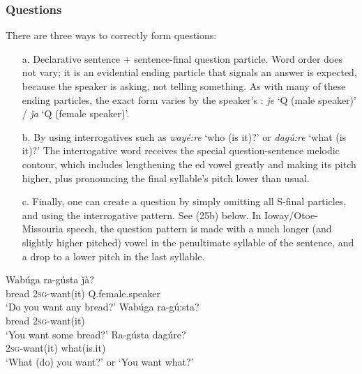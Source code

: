 \documentclass[output=paper]{LSP/langsci}
\begin{document}
\subsubsection{Questions} There are three ways to correctly form questions:  	
	          			
\begin{itemize}
\item[a.] Declarative sentence + sentence-final question particle. Word order does not vary; it is an evidential ending particle that signals an answer is expected, because the speaker is asking, not telling something.  As with many of these ending particles, the exact form varies by the speaker's : \textit{\v{j}e} `Q (male speaker)' / \textit{\v{j}a} `Q (female speaker)'. 

\item[b.]  By using interrogatives such as \textit{wayé:re} `who (is it)?' or \textit{dagú:re} `what (is it)?' The interrogative word receives the special question-sentence melodic contour, which includes lengthening the ed vowel greatly and making its pitch higher, plus pronouncing the final syllable's pitch lower than usual.  	

\item[c.]  Finally, one can create a question by simply omitting all S-final particles, and using the interrogative  pattern. See (25b) below.  In Ioway/Otoe-Missouria speech, the question pattern is made with a much longer (and slightly higher pitched) vowel in the penultimate syllable of the sentence, and a drop to a lower pitch in the last syllable.	
\end{itemize}
\begin{exe}
\ex
\begin{xlist}	       		          	     
\ex \gll Wabúga ra-gústa       \v{j}à?  \\						 	      		
bread       2\textsc{sg}-want(it) Q.female.speaker \\					     		
\trans `Do you want any bread?' 
\ex \gll Wabúga ra-gú:sta? \\					 	 	         		
bread        2\textsc{sg}-want(it) \\			     	     		
\trans `You want some bread?'	
\ex \gll Ra-gústa    dagúre?  \\							        		
2\textsc{sg}-want(it) what(is.it) \\				                    		 	
\trans `What (do) you want?' or `You want what?'
\end{xlist}
\end{exe}
\end{document}

